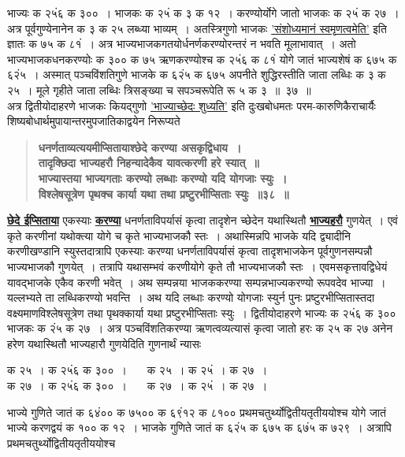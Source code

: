 \documentclass[11pt, openany]{book}
\begin{document}
\begin{sloppypar}
\noindent भाज्यः क २५ं६ क ३००~। भाजकः क २५ं क ३ क १२~। करण्योर्योगे जातो भाजकः क २५ं क २७~। अत्र पूर्वगुण्येनानेन क ३ क २५ लब्ध्या भाव्यम्~। अतस्त्रिगुणो भाजकः \hyperref[1.7]{'संशोध्यमानं स्वमृणत्वमेति'} इति ज्ञातः क ७५ क ८१ं~। अत्र भाज्यभाजकगतयोर्धनर्णकरण्योरन्तरं न भवति मूलाभावात्~। अतो भाज्यभाजकधनकरण्योः क ३०० क ७५ ऋणकरण्योश्च क २५ं६ क ८१ं योगे जातं भाज्यशेषं क ६७५ क ६२ं५~। अस्मात् पञ्चविंशतिगुणे भाजके क ६२ं५ क ६७५ अपनीते शुद्धिरस्तीति जाता लब्धिः क ३ क २५~। मूले गृहीते जाता लब्धिः त्रिसङ्ख्या च सपञ्चरूपेति रू ५ क ३~॥~३७~॥\\

{\small अत्र द्वितीयोदाहरणे भाजकः कियद्गुणो \hyperref[3.29]{'भाज्याच्छेदः शुध्यति'} इति दुःखबोधमतः परम-कारुणिकैराचार्यैः शिष्यबोधार्थमुपायान्तरमुपजातिकाद्वयेन निरूप्यते\textendash }

 \label{4.38}
\begin{quote}
{\large \textbf{{\color{purple}धनर्णताव्यत्ययमीप्सितायाश्छेदे करण्या असकृद्विधाय~।\\
तादृक्छिदा भाज्यहरौ निहन्यादेकैव यावत्करणी हरे स्यात्~॥\\
भाज्यास्तया भाज्यगताः करण्यो लब्धाः करण्यो यदि योगजाः स्युः~।\\
विश्लेषसूत्रेण पृथक्च कार्या यथा तथा प्रष्टुरभीप्सिताः स्युः~॥३८~॥ }}}
\end{quote}

\hyperref[4.38]{\textbf{छेदे ईप्सिताया}} एकस्याः \hyperref[4.38]{\textbf{करण्या}} धनर्णताविपर्यासं कृत्वा तादृशेन च्छेदेन यथास्थितौ \hyperref[4.38]{\textbf{भाज्यहरौ}} गुणयेत्~। एवं कृते करणीनां यथोक्त्या योगे च कृते भाज्यभाजकौ स्तः~। अथास्मिन्नपि भाजके यदि द्व्यादीनि करणीखण्डानि स्युस्तदात्रापि एकस्याः करण्या धनर्णताविपर्यासं कृत्वा तादृशभाजकेन पूर्वगुणनसम्पन्नौ भाज्यभाजकौ गुणयेत्~। तत्रापि यथासम्भवं करणीयोगे कृते तौ भाज्यभाजकौ स्तः~। एवमसकृत्तावद्विधेयं यावद्भाजके एकैव करणी भवेत्~। अथ सम्पन्नया भाजककरण्या सम्पन्नभाज्यकरण्यो रूपवदेव भाज्या~। यल्लभ्यते ता लब्धिकरण्यो भवन्ति~। अथ यदि लब्धाः करण्यो योगजाः स्युर्न पुनः प्रष्टुरभीप्सितास्तदा वक्ष्यमाणविश्लेषसूत्रेण तथा पृथक्कार्या यथा प्रष्टुरभीप्सिताः स्युः~। द्वितीयोदाहरणे भाज्यः क २५ं६ क ३०० भाजकः क २ं५ क २७~। अत्र पञ्चविंशतिकरण्या ऋणत्वव्यत्यासं कृत्वा जातो हरः क २५ क २७ अनेन हरेण यथास्थितौ भाज्यहारौ गुणयेदिति गुणनार्थं न्यासः
\vspace{-3mm}

\begin{center}
क २५~। क २५ं६ क ३००~। ~~~क २५~। क २५ं~। क २७~। \\
क २७~। क २५ं६ क ३००~। ~~~क २७~। क २५ं~। क २७~। 
\end{center}
\vspace{-1mm}

\noindent भाज्ये गुणिते जातं क ६४ं०० क ७५०० क ६९ं१२ क ८१०० प्रथमचतुर्थ्योद्वितीयतृतीययोश्च योगे जातं भाज्ये करणद्वयं क १०० क १२~। भाजके गुणिते जातं क ६२ं५ क ६७५ क ६७ं५ क ७२९~। अत्रापि प्रथमचतुर्थ्योद्वितीयतृतीययोश्च
\end{sloppypar}
\end{document}
